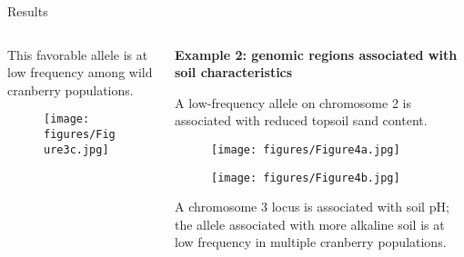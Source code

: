 \documentclass[final]{beamer}
\newlength{\onecolwid}
\newlength{\twocolwid}
\begin{document}
\begin{frame}[t]
\begin{columns}[t]
\begin{column}{\twocolwid}
\begin{block}{Results}
\begin{columns}[t,totalwidth=\twocolwid]
\begin{column}{\onecolwid}
This favorable allele is at low frequency among wild cranberry populations.


\begin{center}
\begin{figure}
  \texttt{[image: figures/Figure3c.jpg]}
\end{figure}
\end{center}




\end{column} %

\begin{column}{\onecolwid} %



\vspace{0.5cm}


\begin{center}
\textbf{Example 2: genomic regions associated with soil characteristics}
\end{center}


A low-frequency allele on chromosome 2 is associated with reduced topsoil sand content.


\begin{center}
\begin{figure}
  \texttt{[image: figures/Figure4a.jpg]}
\end{figure}
\end{center}

\vspace{1cm}

\begin{center}
\begin{figure}
  \texttt{[image: figures/Figure4b.jpg]}
\end{figure}
\end{center}



\vspace{3cm}

A chromosome 3 locus is associated with soil pH; the allele associated with more alkaline soil is at low frequency in multiple cranberry populations.



\end{column}
\end{columns}
\end{block}
\end{column}
\end{columns}
\end{frame}
\end{document}
